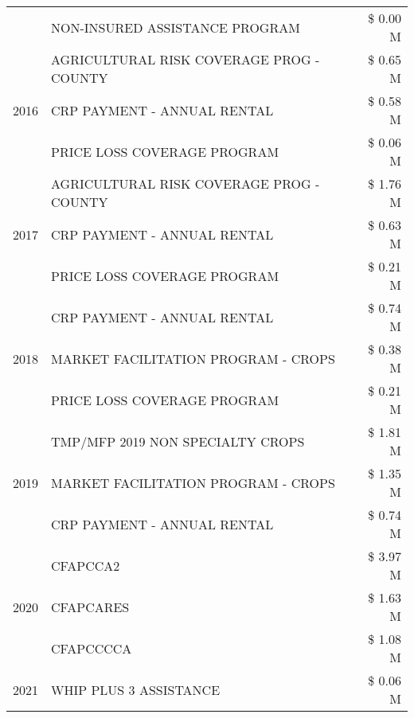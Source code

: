 \begin{tabular}{llr}
 & NON-INSURED ASSISTANCE PROGRAM & \$ 0.00 M \\
\cline{1-3}
\multirow[t]{3}{*}{2016} & AGRICULTURAL RISK COVERAGE PROG - COUNTY & \$ 0.65 M \\
 & CRP PAYMENT - ANNUAL RENTAL & \$ 0.58 M \\
 & PRICE LOSS COVERAGE PROGRAM & \$ 0.06 M \\
\cline{1-3}
\multirow[t]{3}{*}{2017} & AGRICULTURAL RISK COVERAGE PROG - COUNTY & \$ 1.76 M \\
 & CRP PAYMENT - ANNUAL RENTAL & \$ 0.63 M \\
 & PRICE LOSS COVERAGE PROGRAM & \$ 0.21 M \\
\cline{1-3}
\multirow[t]{3}{*}{2018} & CRP PAYMENT - ANNUAL RENTAL & \$ 0.74 M \\
 & MARKET FACILITATION PROGRAM - CROPS & \$ 0.38 M \\
 & PRICE LOSS COVERAGE PROGRAM & \$ 0.21 M \\
\cline{1-3}
\multirow[t]{3}{*}{2019} & TMP/MFP 2019 NON SPECIALTY CROPS & \$ 1.81 M \\
 & MARKET FACILITATION PROGRAM - CROPS & \$ 1.35 M \\
 & CRP PAYMENT - ANNUAL RENTAL & \$ 0.74 M \\
\cline{1-3}
\multirow[t]{3}{*}{2020} & CFAPCCA2 & \$ 3.97 M \\
 & CFAPCARES & \$ 1.63 M \\
 & CFAPCCCCA & \$ 1.08 M \\
\cline{1-3}
2021 & WHIP PLUS 3 ASSISTANCE & \$ 0.06 M \\
\cline{1-3}
\bottomrule
\end{tabular}
